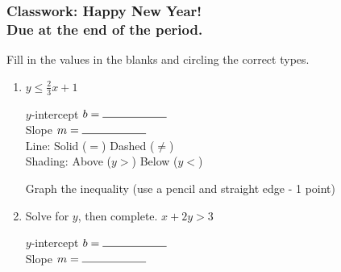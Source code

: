 \documentclass[12pt, twoside]{article}
\begin{document}
\subsubsection*{Classwork: Happy New Year!\\Due at the end of the period.}
Fill in the values in the blanks and circling the correct types.
  \begin{enumerate}

    \item $\displaystyle y \leq \frac{2}{3} x +1 $

      \vspace{0.25cm}
      \begin{multicols}{2}
        $y$-intercept $b= \rule{2cm}{0.15mm}$ \\[0.5cm]
        Slope \hspace{0.7cm} $m= \rule{2cm}{0.15mm}$\\[0.5cm]

        Line: \hspace{1cm} Solid ($=$) \hspace{0.5cm} Dashed ($\neq$)\\[0.5cm]
        Shading: \hspace{0.3cm} Above ($y>$) \hspace{0.25cm} Below ($y<$)\\
      \end{multicols}
      Graph the inequality (use a pencil and straight edge - 1 point)

      \begin{center} %
      \end{center}

    \item Solve for $y$, then complete. $\displaystyle x+ 2y > 3 $

        \vspace{2cm}
        \begin{multicols}{2}
          \raggedcolumns
          $y$-intercept $b= \rule{2cm}{0.15mm}$ \\[0.5cm]
          Slope \hspace{0.7cm} $m= \rule{2cm}{0.15mm}$\\


\end{multicols}
\end{enumerate}
\end{document}
